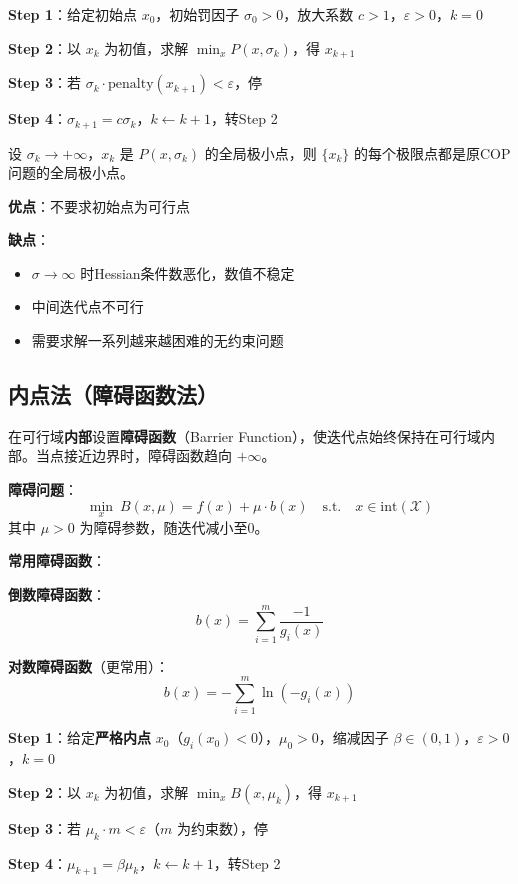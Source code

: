 \begin{algobox}[外点罚函数法算法]
\textbf{Step 1}：给定初始点 $x_0$，初始罚因子 $\sigma_0 > 0$，放大系数 $c > 1$，$\varepsilon > 0$，$k = 0$

\textbf{Step 2}：以 $x_k$ 为初值，求解 $\min_x P(x, \sigma_k)$，得 $x_{k+1}$

\textbf{Step 3}：若 $\sigma_k \cdot \text{penalty}(x_{k+1}) < \varepsilon$，停

\textbf{Step 4}：$\sigma_{k+1} = c \sigma_k$，$k \leftarrow k+1$，转Step 2
\end{algobox}

\begin{theorem}[外点罚函数法收敛性]
设 $\sigma_k \to +\infty$，$x_k$ 是 $P(x, \sigma_k)$ 的全局极小点，则 $\{x_k\}$ 的每个极限点都是原COP问题的全局极小点。
\end{theorem}

\begin{notebox}[外点罚函数法的优缺点]
\textbf{优点}：不要求初始点为可行点

\textbf{缺点}：
\begin{itemize}
    \item $\sigma \to \infty$ 时Hessian条件数恶化，数值不稳定
    \item 中间迭代点不可行
    \item 需要求解一系列越来越困难的无约束问题
\end{itemize}
\end{notebox}

\subsection{内点法（障碍函数法）}

\begin{conceptbox}[内点法思想]
在可行域\textbf{内部}设置\textbf{障碍函数}（Barrier Function），使迭代点始终保持在可行域内部。当点接近边界时，障碍函数趋向 $+\infty$。

\textbf{障碍问题}：
\[
\min_x\ B(x, \mu) = f(x) + \mu \cdot b(x)\quad \text{s.t.}\quad x \in \text{int}(\mathcal{X})
\]
其中 $\mu > 0$ 为障碍参数，随迭代减小至0。
\end{conceptbox}

\textbf{常用障碍函数}：

\textbf{倒数障碍函数}：
\[
b(x) = \sum_{i=1}^{m} \frac{-1}{g_i(x)}
\]

\textbf{对数障碍函数}（更常用）：
\[
b(x) = -\sum_{i=1}^{m} \ln(-g_i(x))
\]

\begin{algobox}[内点法算法]
\textbf{Step 1}：给定\textbf{严格内点} $x_0$（$g_i(x_0) < 0$），$\mu_0 > 0$，缩减因子 $\beta \in (0, 1)$，$\varepsilon > 0$，$k = 0$

\textbf{Step 2}：以 $x_k$ 为初值，求解 $\min_x B(x, \mu_k)$，得 $x_{k+1}$

\textbf{Step 3}：若 $\mu_k \cdot m < \varepsilon$（$m$ 为约束数），停

\textbf{Step 4}：$\mu_{k+1} = \beta \mu_k$，$k \leftarrow k+1$，转Step 2
\end{algobox}

